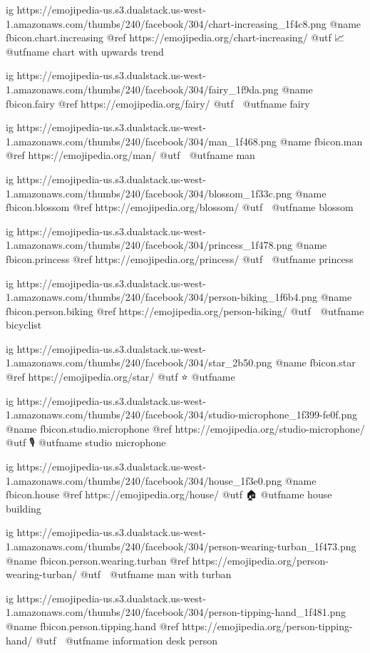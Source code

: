   ig https://emojipedia-us.s3.dualstack.us-west-1.amazonaws.com/thumbs/240/facebook/304/chart-increasing_1f4c8.png
  @name fbicon.chart.increasing
  @ref https://emojipedia.org/chart-increasing/
  @utf 📈
  @utfname chart with upwards trend

  ig https://emojipedia-us.s3.dualstack.us-west-1.amazonaws.com/thumbs/240/facebook/304/fairy_1f9da.png
  @name fbicon.fairy
  @ref https://emojipedia.org/fairy/
  @utf 🧚
  @utfname fairy

  ig https://emojipedia-us.s3.dualstack.us-west-1.amazonaws.com/thumbs/240/facebook/304/man_1f468.png
  @name fbicon.man
  @ref https://emojipedia.org/man/
  @utf 👨
  @utfname man

  ig https://emojipedia-us.s3.dualstack.us-west-1.amazonaws.com/thumbs/240/facebook/304/blossom_1f33c.png
  @name fbicon.blossom
  @ref https://emojipedia.org/blossom/
  @utf 🌼
  @utfname blossom

  ig https://emojipedia-us.s3.dualstack.us-west-1.amazonaws.com/thumbs/240/facebook/304/princess_1f478.png
  @name fbicon.princess
  @ref https://emojipedia.org/princess/
  @utf 👸
  @utfname princess

  ig https://emojipedia-us.s3.dualstack.us-west-1.amazonaws.com/thumbs/240/facebook/304/person-biking_1f6b4.png
  @name fbicon.person.biking
  @ref https://emojipedia.org/person-biking/
  @utf 🚴
  @utfname bicyclist

  ig https://emojipedia-us.s3.dualstack.us-west-1.amazonaws.com/thumbs/240/facebook/304/star_2b50.png
  @name fbicon.star
  @ref https://emojipedia.org/star/
  @utf ⭐️
  @utfname

  ig https://emojipedia-us.s3.dualstack.us-west-1.amazonaws.com/thumbs/240/facebook/304/studio-microphone_1f399-fe0f.png
  @name fbicon.studio.microphone
  @ref https://emojipedia.org/studio-microphone/
  @utf 🎙
  @utfname studio microphone

  ig https://emojipedia-us.s3.dualstack.us-west-1.amazonaws.com/thumbs/240/facebook/304/house_1f3e0.png
  @name fbicon.house
  @ref https://emojipedia.org/house/
  @utf 🏠
  @utfname house building

  ig https://emojipedia-us.s3.dualstack.us-west-1.amazonaws.com/thumbs/240/facebook/304/person-wearing-turban_1f473.png
  @name fbicon.person.wearing.turban
  @ref https://emojipedia.org/person-wearing-turban/
  @utf 👳
  @utfname man with turban

  ig https://emojipedia-us.s3.dualstack.us-west-1.amazonaws.com/thumbs/240/facebook/304/person-tipping-hand_1f481.png
  @name fbicon.person.tipping.hand
  @ref https://emojipedia.org/person-tipping-hand/
  @utf 💁
  @utfname information desk person

